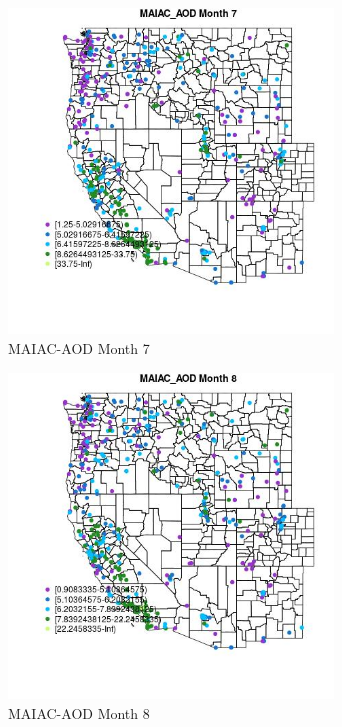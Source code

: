\begin{figure} 
\centering  
\includegraphics[width=0.77\textwidth]{Code_Outputs/ML_input_report_ML_input_PM25_Step5_part_d_de_duplicated_aves_ML_input_MapObsMo7MAIAC_AOD.jpg} 
\caption{\label{fig:ML_input_report_ML_input_PM25_Step5_part_d_de_duplicated_aves_ML_inputMapObsMo7MAIAC_AOD}MAIAC-AOD Month 7} 
\end{figure} 
 

\begin{figure} 
\centering  
\includegraphics[width=0.77\textwidth]{Code_Outputs/ML_input_report_ML_input_PM25_Step5_part_d_de_duplicated_aves_ML_input_MapObsMo8MAIAC_AOD.jpg} 
\caption{\label{fig:ML_input_report_ML_input_PM25_Step5_part_d_de_duplicated_aves_ML_inputMapObsMo8MAIAC_AOD}MAIAC-AOD Month 8} 
\end{figure} 
 

